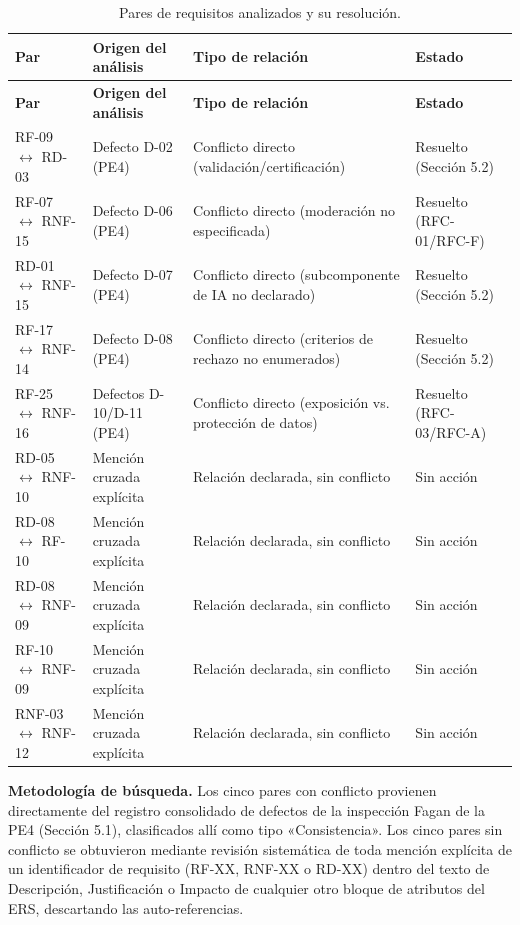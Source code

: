 \documentclass[journal,onecolumn]{IEEEtran}
\begin{document}
	\begin{longtable}{L{3cm} L{3.5cm} L{3.5cm} L{2.5cm}}
		\caption{Pares de requisitos analizados y su resolución.}\label{tab:pares-m2}\\
		\toprule
		\textbf{Par} & \textbf{Origen del análisis} & \textbf{Tipo de relación} & \textbf{Estado} \\
		\midrule
		\endfirsthead
		\toprule
		\textbf{Par} & \textbf{Origen del análisis} & \textbf{Tipo de relación} & \textbf{Estado} \\
		\midrule
		\endhead
		\bottomrule
		\endfoot
		RF-09 $\leftrightarrow$ RD-03 & Defecto D-02 (PE4) & Conflicto directo (validación/certificación) & Resuelto (Sección 5.2) \\
		\addlinespace
		RF-07 $\leftrightarrow$ RNF-15 & Defecto D-06 (PE4) & Conflicto directo (moderación no especificada) & Resuelto (RFC-01/RFC-F) \\
		\addlinespace
		RD-01 $\leftrightarrow$ RNF-15 & Defecto D-07 (PE4) & Conflicto directo (subcomponente de IA no declarado) & Resuelto (Sección 5.2) \\
		\addlinespace
		RF-17 $\leftrightarrow$ RNF-14 & Defecto D-08 (PE4) & Conflicto directo (criterios de rechazo no enumerados) & Resuelto (Sección 5.2) \\
		\addlinespace
		RF-25 $\leftrightarrow$ RNF-16 & Defectos D-10/D-11 (PE4) & Conflicto directo (exposición vs. protección de datos) & Resuelto (RFC-03/RFC-A) \\
		\addlinespace
		RD-05 $\leftrightarrow$ RNF-10 & Mención cruzada explícita & Relación declarada, sin conflicto & Sin acción \\
		\addlinespace
		RD-08 $\leftrightarrow$ RF-10 & Mención cruzada explícita & Relación declarada, sin conflicto & Sin acción \\
		\addlinespace
		RD-08 $\leftrightarrow$ RNF-09 & Mención cruzada explícita & Relación declarada, sin conflicto & Sin acción \\
		\addlinespace
		RF-10 $\leftrightarrow$ RNF-09 & Mención cruzada explícita & Relación declarada, sin conflicto & Sin acción \\
		\addlinespace
		RNF-03 $\leftrightarrow$ RNF-12 & Mención cruzada explícita & Relación declarada, sin conflicto & Sin acción \\
	\end{longtable}
	
	\textbf{Metodología de búsqueda.} Los cinco pares con conflicto provienen directamente del registro consolidado de defectos de la inspección Fagan de la PE4 (Sección 5.1), clasificados allí como tipo «Consistencia». Los cinco pares sin conflicto se obtuvieron mediante revisión sistemática de toda mención explícita de un identificador de requisito (RF-XX, RNF-XX o RD-XX) dentro del texto de Descripción, Justificación o Impacto de cualquier otro bloque de atributos del ERS, descartando las auto-referencias.
	
\end{document}
